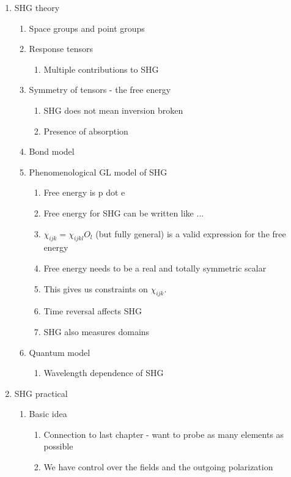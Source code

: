 \documentclass{article}
\begin{document}
\begin{enumerate}
\item SHG theory
    \begin{enumerate}
    \item Space groups and point groups
    \item Response tensors
        \begin{enumerate}
        \item Multiple contributions to SHG
        \end{enumerate}
    \item Symmetry of tensors - the free energy
        \begin{enumerate}
        \item SHG does not mean inversion broken
        \item Presence of absorption
        \end{enumerate}
    \item Bond model
    \item Phenomenological GL model of SHG
        \begin{enumerate}
        \item Free energy is p dot e
        \item Free energy for SHG can be written like ...
        \item $\chi_{ijk} = \chi_{ijkl} O_l$ (but fully general) is a valid expression for the free energy
        \item Free energy needs to be a real and totally symmetric scalar
        \item This gives us constraints on $\chi_{ijk}$.
        \item Time reversal affects SHG
        \item SHG also measures domains
        \end{enumerate}
    \item Quantum model
        \begin{enumerate}
        \item Wavelength dependence of SHG
        \end{enumerate}
    \end{enumerate}
\item SHG practical
    \begin{enumerate}
    \item Basic idea
        \begin{enumerate}
        \item Connection to last chapter - want to probe as many elements as possible
        \item We have control over the fields and the outgoing polarization

\end{enumerate}
\end{enumerate}
\end{enumerate}
\end{document}
